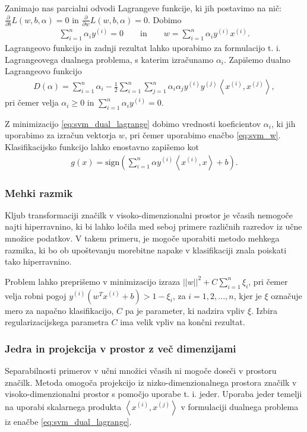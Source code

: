 \documentclass[11pt,a4paper,openany]{book}
\begin{document}
Zanimajo nas parcialni odvodi Lagrangeve funkcije, ki jih postavimo na nič: $\frac{\partial}{\partial b}L(w, b, \alpha) = 0$ in $\frac{\partial}{\partial w}L(w, b, \alpha) = 0$. Dobimo
\begin{eqnarray}
	\sum^n_{i=1}\alpha_iy^{(i)} = 0 \qquad \text{in} \qquad
	w = \sum^n_{i=1}\alpha_iy^{(i)}x^{(i)}.
	\label{eq:svm_w}
\end{eqnarray}
Lagrangeovo funkcijo in zadnji rezultat lahko uporabimo za formulacijo t. i. Lagrangeovega dualnega problema, s katerim izračunamo $\alpha_i$. Zapišemo dualno Lagrangeovo funkcijo
\begin{eqnarray}
	D(\alpha) = \sum^n_{i=1} \alpha_i - \frac{1}{2}\sum^n_{i=1} \sum^n_{j=1} \alpha_i\alpha_j y^{(i)}y^{(j)} \left<x^{(i)},x^{(j)} \right>,
	\label{eq:svm_dual_lagrange}
\end{eqnarray}
pri čemer velja $\alpha_i \geq 0$ in $\sum^n_{i=1}\alpha_iy^{(i)} = 0$.

Z minimizacijo \ref{eq:svm_dual_lagrange} dobimo vrednosti koeficientov $\alpha_i$, ki jih uporabimo za izračun vektorja $w$, pri čemer uporabimo enačbo \ref{eq:svm_w}. Klasifikacijsko funkcijo lahko enostavno zapišemo kot
\begin{eqnarray}
	g(x) = \text{sign} \left(\sum^n_{i=1} \alpha y^{(i)} \left<x^{(i)},x\right> + b\right).
\end{eqnarray}

\subsubsection{Mehki razmik}
Kljub transformaciji značilk v visoko-dimenzionalni prostor je včasih nemogoče najti hiperravnino, ki bi lahko ločila med seboj primere različnih razredov iz učne množice podatkov. V takem primeru, je mogoče uporabiti metodo mehkega razmika, ki bo ob upoštevanju morebitne napake v klasifikaciji znala poiskati tako hiperravnino. 

Problem lahko preprišemo v minimizacijo izraza $||w||^2 + C\sum^n_{i=1}\xi_i$, pri čemer velja robni pogoj $y^{(i)}(w^Tx^{(i)} + b) > 1 - \xi_i$, za $i = 1, 2, ..., n$, kjer je $\xi$ označuje mero za napačno klasifikacijo, $C$ pa je parameter, ki nadzira vpliv $\xi$. Izbira regularizacijskega parametra $C$ ima velik vpliv na končni rezultat.

\subsubsection{Jedra in projekcija v prostor z več dimenzijami}
Separabilnosti primerov v učni množici včasih ni mogoče doseči v prostoru značilk. Metoda omogoča projekcijo iz nizko-dimenzionalnega prostora značilk v visoko-dimenzionalni prostor s pomočjo uporabe t. i. jeder. Uporaba jeder temelji na uporabi skalarnega produkta $\left<x^{(i)}, x^{(j)}\right>$ v formulaciji dualnega problema iz enačbe \ref{eq:svm_dual_lagrange}. 
\end{document}
